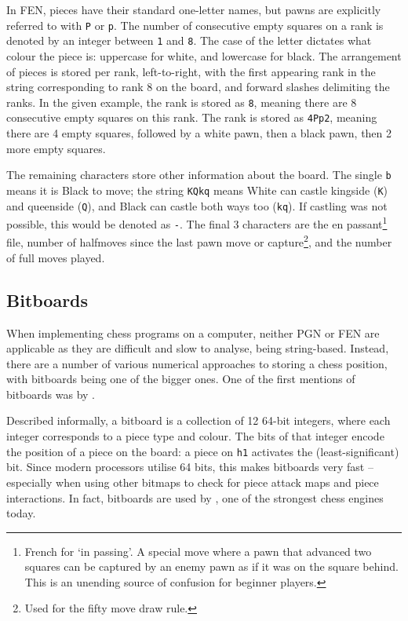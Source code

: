 In FEN, pieces have their standard one-letter names, but pawns are explicitly
referred to with \texttt{P} or \texttt{p}. The number of consecutive empty
squares on a rank is denoted by an integer between \texttt{1} and \texttt{8}.
The case of the letter dictates what colour the piece is: uppercase for white,
and lowercase for black. The arrangement of pieces is stored per rank,
left-to-right, with the first appearing rank in the string corresponding to
rank 8 on the board, and forward slashes delimiting the ranks. In the given
example, the  rank is stored as \texttt{8}, meaning there are 8
consecutive empty squares on this rank. The  rank is stored as
\texttt{4Pp2}, meaning there are 4 empty squares, followed by a white pawn,
then a black pawn, then 2 more empty squares.

The remaining characters store other information about the board. The single
\texttt{b} means it is Black to move; the string \texttt{KQkq} means White can
castle kingside (\texttt{K}) and queenside (\texttt{Q}), and Black can castle
both ways too (\texttt{kq}). If castling was not possible, this would be
denoted as \texttt{-}. The final 3 characters are the en
passant\footnote{French for `in passing'. A special move where a pawn that
advanced two squares can be captured by an enemy pawn as if it was on the
square behind. This is an unending source of confusion for beginner players.}
file, number of halfmoves since the last pawn move or capture\footnote{Used for
the fifty move draw rule.}, and the number of full moves played.

\subsection{Bitboards}

When implementing chess programs on a computer, neither PGN or FEN are
applicable as they are difficult and slow to analyse, being string-based.
Instead, there are a number of various numerical approaches to storing a chess
position, with bitboards being one of the bigger ones. One of the first
mentions of bitboards was by \citet{bitboardsRussian}.

Described informally, a bitboard is a collection of 12 64-bit integers, where
each integer corresponds to a piece type and colour. The bits of that integer
encode the position of a piece on the board: a piece on \texttt{h1} activates
the  (least-significant) bit. Since modern processors utilise 64 bits,
this makes bitboards very fast -- especially when using other bitmaps to check
for piece attack maps and piece interactions. In fact, bitboards are used by
\citet{stockfishBitboard}, one of the strongest chess engines today.

